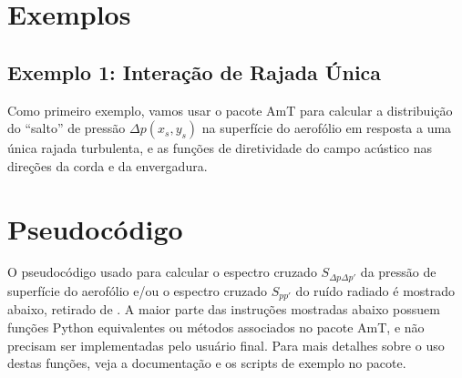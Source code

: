 \documentclass[a4paper, 11pt, twoside]{article}
\begin{document}
\section{Exemplos}

\subsection{Exemplo 1: Interação de Rajada Única}

Como primeiro exemplo, vamos usar o pacote AmT para calcular a distribuição do ``salto'' de pressão $\Delta p(x_s, y_s)$ na superfície do aerofólio em resposta a uma única rajada turbulenta, e as funções de diretividade do campo acústico nas direções da corda e da envergadura.



\clearpage
\newpage
\section{Pseudocódigo}

O pseudocódigo usado para calcular o espectro cruzado $S_{\Delta p \Delta p'}$ da pressão de superfície do aerofólio e/ou o espectro cruzado $S_{pp'}$ do ruído radiado é mostrado abaixo, retirado de \cite{Casagrande_etal2020}. A maior parte das instruções mostradas abaixo possuem funções Python equivalentes ou métodos associados no pacote AmT, e não precisam ser implementadas pelo usuário final. Para mais detalhes sobre o uso destas funções, veja a documentação e os scripts de exemplo no pacote.
\end{document}
